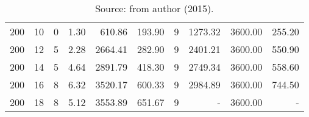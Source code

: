 \begin{appendices}
\begin{table*}[h]
\begin{center}
\begin{tabular} {l l | r r r r | r r r r}
200 & 10                                &   0             & 1.30          &  610.86     &  193.90      &  9            &  1273.32 &  3600.00    &  255.20           \\ 
200 & 12                                &   5             & 2.28          &  2664.41    &  282.90      &  9            &  2401.21 &  3600.00    &  550.90           \\ 
200 & 14                                &   5             & 4.64          &  2891.79    &  418.30      &  9            &  2749.34 &  3600.00    &  558.60           \\ 
200 & 16                                &   8             & 6.32          &  3520.17    &  600.33      &  9            &  2984.89 &  3600.00    &  744.50           \\ 
200 & 18                                &   8             & 5.12          &  3553.89    &  651.67      &  9            &  -       &  3600.00    &  -                \\ 
\hline
\end{tabular}\caption*{Source: from author (2015).}
\end{center}
\end{table*}


\end{appendices}
